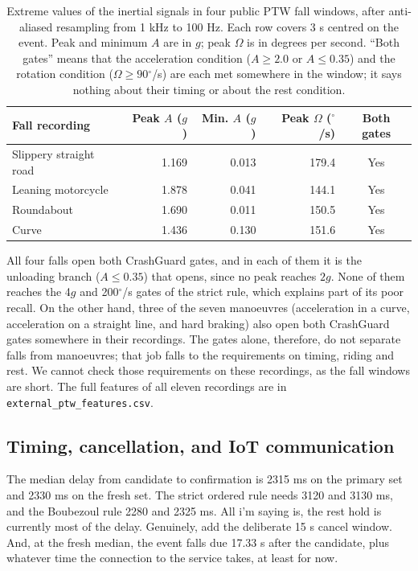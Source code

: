 \documentclass[10pt,a4paper]{article}
\newcommand{\degree}{\ensuremath{^{\circ}}}
\begin{document}
\begin{table}[H]\centering\small\caption{Extreme values of the inertial signals in four public PTW fall windows, after anti-aliased resampling from 1 kHz to 100 Hz. Each row covers 3 s centred on the event. Peak and minimum $A$ are in $g$; peak $\Omega$ is in degrees per second. ``Both gates'' means that the acceleration condition ($A\geq2.0$ or $A\leq0.35$) and the rotation condition ($\Omega\geq90\degree$/s) are each met somewhere in the window; it says nothing about their timing or about the rest condition.}\label{tab:ext}
\begin{tabularx}{\linewidth}{|X|r|r|r|c|}\hline
\textbf{Fall recording} & \textbf{Peak $A$ ($g$)} & \textbf{Min. $A$ ($g$)} & \textbf{Peak $\Omega$ ($\degree$/s)} & \textbf{Both gates}\\\hline
Slippery straight road & 1.169 & 0.013 & 179.4 & Yes\\\hline
Leaning motorcycle & 1.878 & 0.041 & 144.1 & Yes\\\hline
Roundabout & 1.690 & 0.011 & 150.5 & Yes\\\hline
Curve & 1.436 & 0.130 & 151.6 & Yes\\\hline
\end{tabularx}\end{table}

All four falls open both CrashGuard gates, and in each of them it is the unloading branch ($A\leq0.35$) that opens, since no peak reaches $2g$. None of them reaches the 4$g$ and 200$\degree$/s gates of the strict rule, which explains part of its poor recall. On the other hand, three of the seven manoeuvres (acceleration in a curve, acceleration on a straight line, and hard braking) also open both CrashGuard gates somewhere in their recordings. The gates alone, therefore, do not separate falls from manoeuvres; that job falls to the requirements on timing, riding and rest. We cannot check those requirements on these recordings, as the fall windows are short. The full features of all eleven recordings are in \texttt{external\_ptw\_features.csv}.

\subsection{Timing, cancellation, and IoT communication}
The median delay from candidate to confirmation is 2315 ms on the primary set and 2330 ms on the fresh set. The strict ordered rule needs 3120 and 3130 ms, and the Boubezoul rule 2280 and 2325 ms. All i'm saying is, the rest hold is currently most of the delay. Genuinely, add the deliberate 15 s cancel window. And, at the fresh median, the event falls due 17.33 s after the candidate, plus whatever time the connection to the service takes, at least for now.
\end{document}
